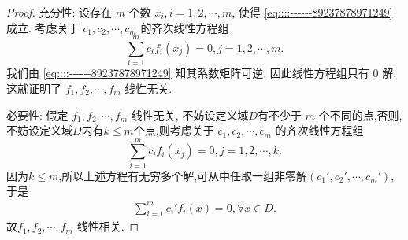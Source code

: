 \documentclass[../../main.tex]{subfiles}%
\begin{document}
\begin{proof}

充分性: 设存在 \( m \) 个数 \( x_i, i = 1, 2, \cdots, m \), 使得 \eqref{eq::::------89237878971249} 成立. 考虑关于 \( c_1, c_2, \cdots, c_m \) 的齐次线性方程组
\[
\sum_{i=1}^m c_i f_i(x_j) = 0, j = 1, 2, \cdots, m.
\]
我们由 \eqref{eq::::------89237878971249} 知其系数矩阵可逆, 因此线性方程组只有 0 解, 这就证明了 \( f_1, f_2, \cdots, f_m \) 线性无关.

必要性: 假定 \( f_1, f_2, \cdots, f_m \) 线性无关, 不妨设定义域$D$有不少于 \( m \) 个不同的点,否则,不妨设定义域$D$内有$k\leqslant m$个点,则考虑关于 \( c_1, c_2, \cdots, c_m \) 的齐次线性方程组
\[
\sum_{i=1}^m c_i f_i(x_j) = 0, j = 1, 2, \cdots, k.
\]
因为$k\leqslant m$,所以上述方程有无穷多个解,可从中任取一组非零解$(c_1',c_2',\cdots,c_m')$,于是
\begin{align*}
\sum_{i=1}^m c_i' f_i(x) = 0, \forall x \in D.
\end{align*}
故\( f_1, f_2, \cdots, f_m \) 线性相关.


\end{proof}
\end{document}

